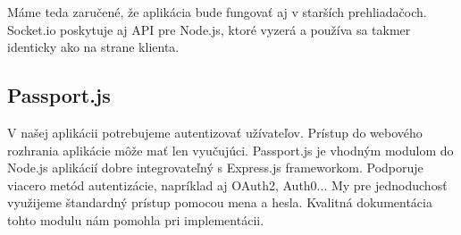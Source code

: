 Máme teda zaručené, že aplikácia bude fungovať aj v starších prehliadačoch. Socket.io
poskytuje aj API pre Node.js, ktoré vyzerá a používa sa takmer identicky ako na strane
klienta.~\cite{bib:raisocketio,bib:walshwebsocket}

\subsection{Passport.js}
\label{sec:nodejs:passportjs}

V našej aplikácii potrebujeme autentizovať užívateľov. Prístup do webového
rozhrania aplikácie môže mať len vyučujúci. Passport.js je vhodným modulom
do Node.js aplikácií dobre integrovateľný s Express.js frameworkom.
Podporuje viacero metód autentizácie, napríklad aj OAuth2, Auth0...
My pre jednoduchosť využijeme štandardný prístup pomocou mena a hesla.
Kvalitná dokumentácia~\cite{bib:passportjsdocs} tohto modulu nám pomohla pri
implementácii.